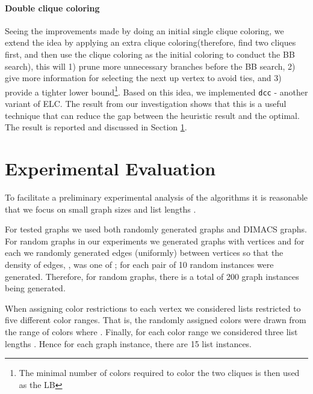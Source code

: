 \documentclass[10pt]{article}
\begin{document}
\paragraph{Double clique coloring} Seeing the improvements made by doing an initial single clique coloring, we extend the idea by applying an extra clique coloring(therefore, find two cliques first, and then use the clique coloring as the initial coloring to conduct the BB search), this will 1) prune more unnecessary branches before the BB search, 2) give more information for selecting the next up vertex to avoid ties, and 3) provide a tighter lower bound\footnote{The minimal number of colors required to color the two cliques is then used as the LB}. Based on this idea, we implemented \texttt{dcc} - another variant of ELC. The result from our investigation shows that this is a useful technique that can reduce the gap between the heuristic result and the optimal. The result is reported and discussed in Section \ref{sec:expers}.

\section{Experimental Evaluation}\label{sec:expers}

To facilitate a preliminary experimental analysis of the algorithms it
is reasonable that we focus on small graph sizes  and list lengths .

For tested graphs we used both randomly generated graphs and DIMACS \cite{dimacs} graphs. 
For random graphs in our experiments we generated graphs with  vertices and
for each we randomly generated edges (uniformly) between vertices so
that the density of edges, , was one of ; for each pair of  10 random instances 
were generated. Therefore, for random graphs,  there is a total of 200 graph instances being generated. 

When assigning color restrictions to 
each vertex we considered lists restricted to five different color ranges.  That is, the randomly
assigned colors were drawn from the range of colors  where
.  Finally, for each color range we considered
three list lengths . Hence for each graph instance, there are 15 list instances.
\end{document}
